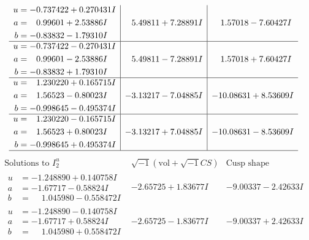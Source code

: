 \documentclass[1p]{elsarticle_modified}
\theoremstyle{definition}
\newcommand{\I}{\sqrt{-1}}
\begin{document}
$$\begin{array}{c|c|c}
\begin{aligned}
u &= -0.737422 + 0.270431 I \\
a &= \phantom{-}0.99601 + 2.53886 I \\
b &= -0.83832 - 1.79310 I\end{aligned}
 & \phantom{-}5.49811 + 7.28891 I & \phantom{-}1.57018 - 7.60427 I \\ \hline\begin{aligned}
u &= -0.737422 - 0.270431 I \\
a &= \phantom{-}0.99601 - 2.53886 I \\
b &= -0.83832 + 1.79310 I\end{aligned}
 & \phantom{-}5.49811 - 7.28891 I & \phantom{-}1.57018 + 7.60427 I \\ \hline\begin{aligned}
u &= \phantom{-}1.230220 + 0.165715 I \\
a &= \phantom{-}1.56523 - 0.80023 I \\
b &= -0.998645 - 0.495374 I\end{aligned}
 & -3.13217 - 7.04885 I & -10.08631 + 8.53609 I \\ \hline\begin{aligned}
u &= \phantom{-}1.230220 - 0.165715 I \\
a &= \phantom{-}1.56523 + 0.80023 I \\
b &= -0.998645 + 0.495374 I\end{aligned}
 & -3.13217 + 7.04885 I & -10.08631 - 8.53609 I\\
 \hline 
 \end{array}$$\newpage$$\begin{array}{c|c|c}  
\text{Solutions to }I^u_{2}& \I (\text{vol} + \sqrt{-1}CS) & \text{Cusp shape}\\
 \hline 
\begin{aligned}
u &= -1.248890 + 0.140758 I \\
a &= -1.67717 - 0.58824 I \\
b &= \phantom{-}1.045980 - 0.558472 I\end{aligned}
 & -2.65725 + 1.83677 I & -9.00337 - 2.42633 I \\ \hline\begin{aligned}
u &= -1.248890 - 0.140758 I \\
a &= -1.67717 + 0.58824 I \\
b &= \phantom{-}1.045980 + 0.558472 I\end{aligned}
 & -2.65725 - 1.83677 I & -9.00337 + 2.42633 I \\ \hline\begin{aligned}

\end{aligned}
\end{array}$$
\end{document}

